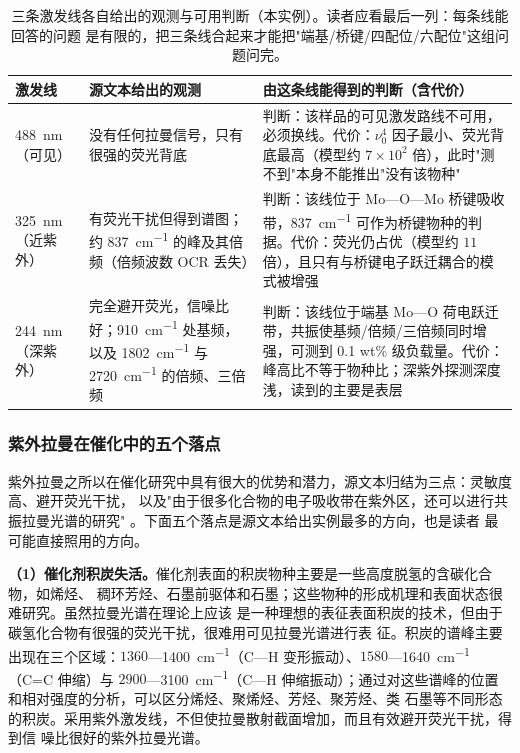 \begin{table}[htbp]
\centering
\caption{三条激发线各自给出的观测与可用判断（本实例）。读者应看最后一列：每条线能回答的问题
是有限的，把三条线合起来才能把"端基/桥键/四配位/六配位"这组问题问完。}
\label{tab:mo-lines}
{\srcsize
\begin{tabularx}{\columnwidth}{@{}lXX@{}}
\toprule
激发线 & 源文本给出的观测 & 由这条线能得到的判断（含代价） \\
\midrule
\qty{488}{nm}（可见） & 没有任何拉曼信号，只有很强的荧光背底 & 判断：该样品的可见激发路线不可用，必须换线。代价：$\nu_0^4$ 因子最小、荧光背底最高（模型约 $7\times10^2$ 倍），此时"测不到"本身不能推出"没有该物种" \\
\qty{325}{nm}（近紫外） & 有荧光干扰但得到谱图；约 \qty{837}{cm^{-1}} 的峰及其倍频（倍频波数 OCR 丢失） & 判断：该线位于 Mo—O—Mo 桥键吸收带，\qty{837}{cm^{-1}} 可作为桥键物种的判据。代价：荧光仍占优（模型约 $11$ 倍），且只有与桥键电子跃迁耦合的模式被增强 \\
\qty{244}{nm}（深紫外） & 完全避开荧光，信噪比好；\qty{910}{cm^{-1}} 处基频，以及 \qty{1802}{cm^{-1}} 与 \qty{2720}{cm^{-1}} 的倍频、三倍频 & 判断：该线位于端基 Mo—O 荷电跃迁带，共振使基频/倍频/三倍频同时增强，可测到 \num{0.1} wt\% 级负载量。代价：峰高比不等于物种比；深紫外探测深度浅，读到的主要是表层 \\
\bottomrule
\end{tabularx}}
\end{table}

\subsubsection{紫外拉曼在催化中的五个落点}

紫外拉曼之所以在催化研究中具有很大的优势和潜力，源文本归结为三点：灵敏度高、避开荧光干扰，
以及"由于很多化合物的电子吸收带在紫外区，还可以进行共振拉曼光谱的研究"
。下面五个落点是源文本给出实例最多的方向，也是读者
最可能直接照用的方向。

\textbf{（1）催化剂积炭失活。}催化剂表面的积炭物种主要是一些高度脱氢的含碳化合物，如烯烃、
稠环芳烃、石墨前驱体和石墨；这些物种的形成机理和表面状态很难研究。虽然拉曼光谱在理论上应该
是一种理想的表征表面积炭的技术，但由于碳氢化合物有很强的荧光干扰，很难用可见拉曼光谱进行表
征。积炭的谱峰主要出现在三个区域：$1360$—\qty{1400}{cm^{-1}}（C—H 变形振动）、$1580$—\qty{1640}{cm^{-1}}
（C=C 伸缩）与 $2900$—\qty{3100}{cm^{-1}}（C—H 伸缩振动）；通过对这些谱峰的位置和相对强度的分析，可以区分烯烃、聚烯烃、芳烃、聚芳烃、类
石墨等不同形态的积炭。采用紫外激发线，不但使拉曼散射截面增加，而且有效避开荧光干扰，得到信
噪比很好的紫外拉曼光谱。

